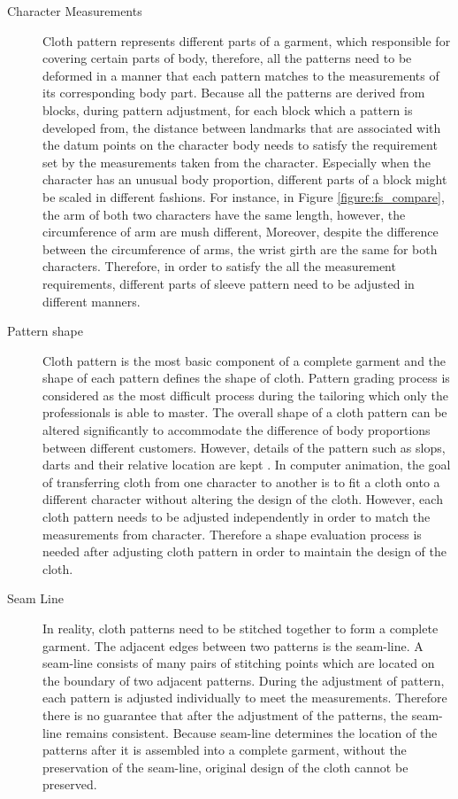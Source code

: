 \begin{description}
\item[Character Measurements] 
Cloth pattern represents different parts of a garment, which responsible for covering certain parts of body, therefore, all the patterns need to be deformed in a manner that each pattern matches to the measurements of its corresponding body part. Because all the patterns are derived from blocks, during pattern adjustment, for each block which a pattern is developed from, the distance between  landmarks that are associated with the datum points on the character body needs to satisfy  the requirement set by the measurements taken from the character. Especially when the character has an unusual body proportion, different parts of a block might be scaled in different fashions. For instance, in Figure \ref{figure:fs_compare}, the arm of both two characters have the same length, however, the circumference of arm are mush different, Moreover, despite the difference between the circumference of arms, the wrist girth are the same for both characters. Therefore, in order to satisfy the all the measurement requirements, different parts of sleeve pattern need to be adjusted in different manners.

\item[Pattern shape] 
Cloth pattern is the most basic component of a complete garment and the shape of each pattern defines the shape of cloth. Pattern grading process is considered as the most difficult process during the tailoring which only the professionals is able to master. The overall shape of a cloth pattern can be altered significantly to accommodate the difference of body proportions between different customers. However, details of the pattern such as slops, darts and their relative location are kept . In computer animation, the goal of transferring cloth from one character to another is to fit a cloth onto a different character without altering the design of the cloth. However, each cloth pattern needs to be adjusted independently in order to match the measurements from character. Therefore a shape evaluation process is needed after adjusting cloth pattern in order to maintain the design of the cloth. 


\item[Seam Line] 
In reality, cloth patterns need to be stitched together to form a complete garment. The adjacent edges between two patterns is the seam-line. A seam-line consists of many pairs of stitching points which are located on the boundary of two adjacent patterns. During the adjustment of pattern, each pattern is adjusted individually to meet the measurements. Therefore there is no guarantee that after the adjustment of the patterns, the seam-line remains consistent. Because seam-line determines the location of the patterns after it is assembled into a complete garment, without the preservation of the seam-line, original design of the cloth cannot be preserved.

\end{description}

